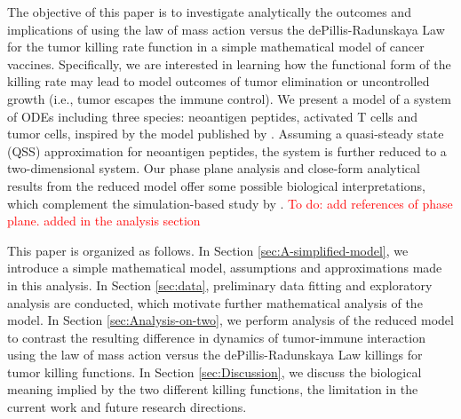 \documentclass[review,authoryear]{elsarticle}
\newcommand{\red}[1]{\textcolor{red}{#1}}
\begin{document}
The objective of this paper is to investigate analytically the outcomes
and implications of using the law of mass action versus the dePillis-Radunskaya
Law for the tumor killing rate function in a simple mathematical
model of cancer vaccines. Specifically, we are interested in learning
how the functional form of the killing rate may lead to model outcomes of tumor elimination
or uncontrolled growth (i.e., tumor escapes the immune control). We present
a model of a system of ODEs including three species: neoantigen peptides, activated T cells and tumor cells, inspired by the model published by \citet{Messan2021}. Assuming a quasi-steady state (QSS) approximation for neoantigen peptides, the system is further reduced to a two-dimensional system. Our phase plane analysis and close-form analytical
results from the reduced model offer some possible biological interpretations, which complement
the simulation-based study by \citet{Messan2021}.  \red{To do: add references of phase plane. added in the analysis section}

This paper is organized as follows. In Section \ref{sec:A-simplified-model},
we introduce a simple mathematical model, assumptions and approximations made in this analysis. In Section \ref{sec:data}, preliminary data fitting and exploratory analysis are conducted, which motivate further mathematical analysis of the model. In Section \ref{sec:Analysis-on-two},
we perform analysis of the reduced model to contrast the resulting
difference in dynamics of tumor-immune interaction using the law of mass action versus the dePillis-Radunskaya
Law killings for tumor killing functions. In Section \ref{sec:Discussion}, we discuss the biological
meaning implied by the two different killing functions, the
limitation in the current work and future research directions. 
\end{document}
